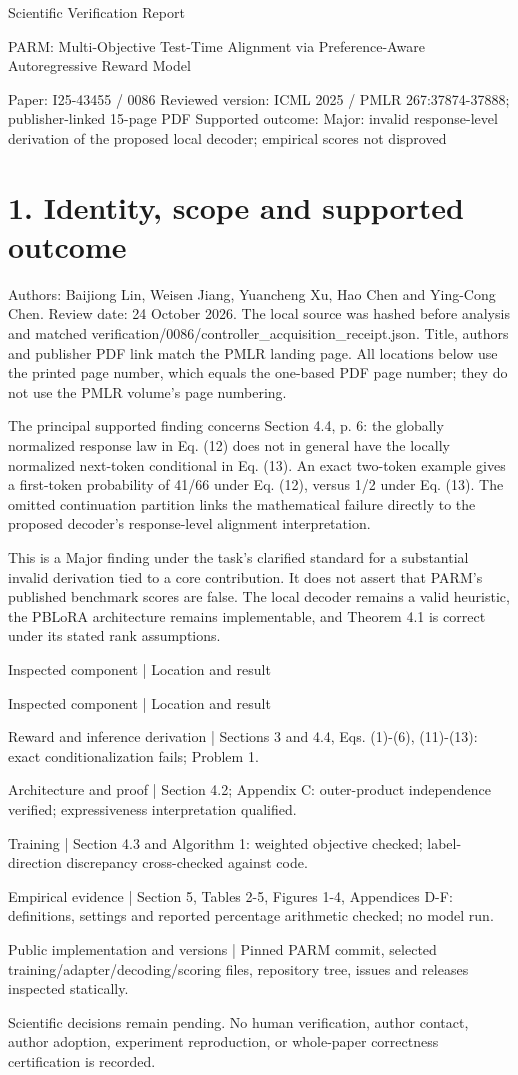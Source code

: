 \documentclass[10pt]{article}
\begin{document}
Scientific Verification Report\par
PARM: Multi-Objective Test-Time Alignment via Preference-Aware Autoregressive Reward Model\par
Paper: I25-43455 / 0086
Reviewed version: ICML 2025 / PMLR 267:37874-37888; publisher-linked 15-page PDF
Supported outcome: Major: invalid response-level derivation of the proposed local decoder; empirical scores not disproved\par
\section*{1. Identity, scope and supported outcome}
Authors: Baijiong Lin, Weisen Jiang, Yuancheng Xu, Hao Chen and Ying-Cong Chen. Review date: 24 October 2026. The local source was hashed before analysis and matched verification/0086/controller\_acquisition\_receipt.json. Title, authors and publisher PDF link match the PMLR landing page. All locations below use the printed page number, which equals the one-based PDF page number; they do not use the PMLR volume’s page numbering.\par
The principal supported finding concerns Section 4.4, p. 6: the globally normalized response law in Eq. (12) does not in general have the locally normalized next-token conditional in Eq. (13). An exact two-token example gives a first-token probability of 41/66 under Eq. (12), versus 1/2 under Eq. (13). The omitted continuation partition links the mathematical failure directly to the proposed decoder’s response-level alignment interpretation.\par
This is a Major finding under the task’s clarified standard for a substantial invalid derivation tied to a core contribution. It does not assert that PARM’s published benchmark scores are false. The local decoder remains a valid heuristic, the PBLoRA architecture remains implementable, and Theorem 4.1 is correct under its stated rank assumptions.\par
Inspected component | Location and result\par
Inspected component | Location and result\par
Reward and inference derivation | Sections 3 and 4.4, Eqs. (1)-(6), (11)-(13): exact conditionalization fails; Problem 1.\par
Architecture and proof | Section 4.2; Appendix C: outer-product independence verified; expressiveness interpretation qualified.\par
Training | Section 4.3 and Algorithm 1: weighted objective checked; label-direction discrepancy cross-checked against code.\par
Empirical evidence | Section 5, Tables 2-5, Figures 1-4, Appendices D-F: definitions, settings and reported percentage arithmetic checked; no model run.\par
Public implementation and versions | Pinned PARM commit, selected training/adapter/decoding/scoring files, repository tree, issues and releases inspected statically.\par
Scientific decisions remain pending. No human verification, author contact, author adoption, experiment reproduction, or whole-paper correctness certification is recorded.\par
\end{document}
